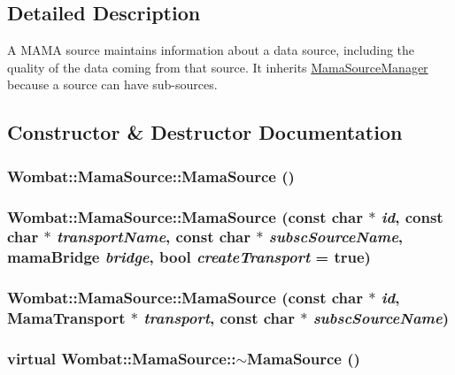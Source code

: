 \subsection{Detailed Description}
A MAMA source maintains information about a data source, including the quality of the data coming from that source. It inherits \hyperlink{classWombat_1_1MamaSourceManager}{MamaSourceManager} because a source can have sub-\/sources. 

\subsection{Constructor \& Destructor Documentation}
\hypertarget{classWombat_1_1MamaSource_aae219bdf6047a5cd0d39edf1e769e7c1}{
\subsubsection[{MamaSource}]{\setlength{\rightskip}{0pt plus 5cm}Wombat::MamaSource::MamaSource ()}}
\label{classWombat_1_1MamaSource_aae219bdf6047a5cd0d39edf1e769e7c1}
\hypertarget{classWombat_1_1MamaSource_ac2638dec484d3153ef9d5f658f0ac81e}{
\subsubsection[{MamaSource}]{\setlength{\rightskip}{0pt plus 5cm}Wombat::MamaSource::MamaSource (const char $\ast$ {\em id}, \/  const char $\ast$ {\em transportName}, \/  const char $\ast$ {\em subscSourceName}, \/  mamaBridge {\em bridge}, \/  bool {\em createTransport} = {\ttfamily true})}}
\label{classWombat_1_1MamaSource_ac2638dec484d3153ef9d5f658f0ac81e}
\hypertarget{classWombat_1_1MamaSource_ab93cd1b640228bfe6eedf745a85b7d07}{
\subsubsection[{MamaSource}]{\setlength{\rightskip}{0pt plus 5cm}Wombat::MamaSource::MamaSource (const char $\ast$ {\em id}, \/  {\bf MamaTransport} $\ast$ {\em transport}, \/  const char $\ast$ {\em subscSourceName})}}
\label{classWombat_1_1MamaSource_ab93cd1b640228bfe6eedf745a85b7d07}
\hypertarget{classWombat_1_1MamaSource_a6697a678c9375af09bd49af4d506cc7a}{
\subsubsection[{$\sim$MamaSource}]{\setlength{\rightskip}{0pt plus 5cm}virtual Wombat::MamaSource::$\sim$MamaSource ()}}
\label{classWombat_1_1MamaSource_a6697a678c9375af09bd49af4d506cc7a}


